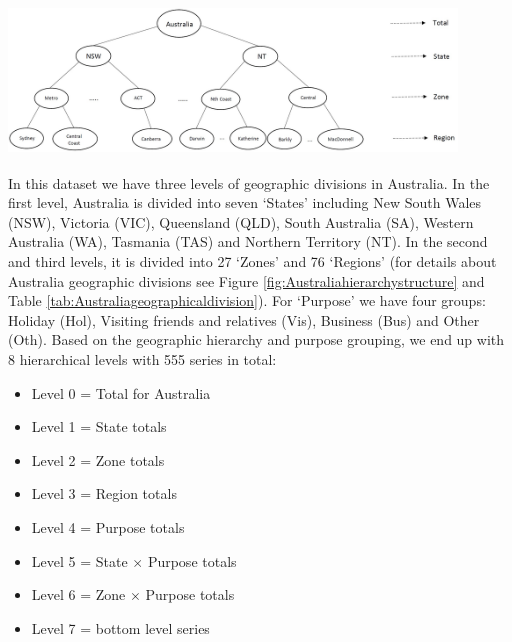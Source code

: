 \documentclass[11pt,a4paper,]{article}
\providecommand{\tightlist}{%
  \setlength{\itemsep}{0pt}\setlength{\parskip}{0pt}}
\let\origfigure\figure
\let\endorigfigure\endfigure
\renewenvironment{figure}[1][2] {
    \expandafter\origfigure\expandafter[!htbp]
} {
    \endorigfigure
}
\begin{document}
\begin{figure}

{\centering \includegraphics[width=450px,height=150px]{Paper-Figures/Australian_hierarchy_structure} 

}

\caption{Australian geographic hierarchical structure.}\label{fig:Australiahierarchystructure}
\end{figure}

\newpage

In this dataset we have three levels of geographic divisions in Australia. In the first level, Australia is divided into seven `States' including New South Wales (NSW), Victoria (VIC), Queensland (QLD), South Australia (SA), Western Australia (WA), Tasmania (TAS) and Northern Territory (NT). In the second and third levels, it is divided into 27 `Zones' and 76 `Regions' (for details about Australia geographic divisions see Figure \ref{fig:Australiahierarchystructure} and Table \ref{tab:Australiageographicaldivision}). For `Purpose' we have four groups: Holiday (Hol), Visiting friends and relatives (Vis), Business (Bus) and Other (Oth). Based on the geographic hierarchy and purpose grouping, we end up with 8 hierarchical levels with 555 series in total:

\begin{itemize}
\tightlist
\item
  Level 0 = Total for Australia
\item
  Level 1 = State totals
\item
  Level 2 = Zone totals
\item
  Level 3 = Region totals
\item
  Level 4 = Purpose totals
\item
  Level 5 = State \(\times\) Purpose totals
\item
  Level 6 = Zone \(\times\) Purpose totals
\item
  Level 7 = bottom level series
\end{itemize}
\end{document}
